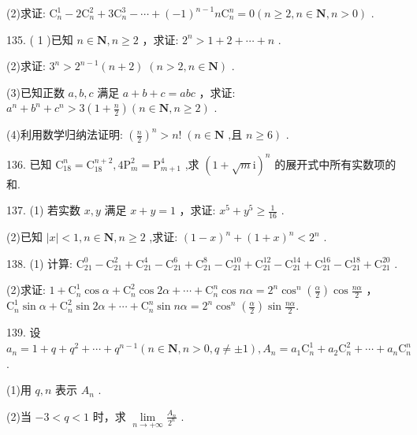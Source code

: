 \documentclass[10pt]{article}
\begin{document}
(2)求证: \({\mathrm{C}}_{n}^{1} - 2{\mathrm{C}}_{n}^{2} + 3{\mathrm{C}}_{n}^{3} - \cdots  + {\left( -1\right) }^{n - 1}n{\mathrm{C}}_{n}^{n} = 0\left( {n \geq  2,n \in  \mathbf{N},n > 0}\right)\) .

135. ( 1 )已知 \(n \in  \mathbf{N},n \geq  2\) ，求证: \({2}^{n} > 1 + 2 + \cdots  + n\) .

(2)求证: \({3}^{n} > {2}^{n - 1}\left( {n + 2}\right) \;\left( {n > 2,n \in  \mathbf{N}}\right)\) .

(3)已知正数 \(a,b,c\) 满足 \(a + b + c = {abc}\) ，求证: \({a}^{n} + {b}^{n} + {c}^{n} > 3\left( {1 + \frac{n}{2}}\right) \left( {n \in  \mathbf{N},n \geq  2}\right)\) .

(4)利用数学归纳法证明: \({\left( \frac{n}{2}\right) }^{n} > n!\;\left( {n \in  \mathbf{N}\text{ ,且 }n \geq  6}\right)\) .

136. 已知 \({\mathrm{C}}_{18}^{n} = {\mathrm{C}}_{18}^{n + 2},4{\mathrm{P}}_{m}^{2} = {\mathrm{P}}_{m + 1}^{4}\) ,求 \({\left( 1 + \sqrt{m}\mathrm{i}\right) }^{n}\) 的展开式中所有实数项的和.

137. (1) 若实数 \(x,y\) 满足 \(x + y = 1\) ，求证: \({x}^{5} + {y}^{5} \geq  \frac{1}{16}\) .

(2)已知 \(\left| x\right|  < 1,n \in  \mathbf{N},n \geq  2\) ,求证: \({\left( 1 - x\right) }^{n} + {\left( 1 + x\right) }^{n} < {2}^{n}\) .

138. (1) 计算: \({\mathrm{C}}_{21}^{0} - {\mathrm{C}}_{21}^{2} + {\mathrm{C}}_{21}^{4} - {\mathrm{C}}_{21}^{6} + {\mathrm{C}}_{21}^{8} - {\mathrm{C}}_{21}^{10} + {\mathrm{C}}_{21}^{12} - {\mathrm{C}}_{21}^{14} + {\mathrm{C}}_{21}^{16} - {\mathrm{C}}_{21}^{18} + {\mathrm{C}}_{21}^{20}\) .

(2)求证: \(1 + {\mathrm{C}}_{n}^{1}\cos \alpha  + {\mathrm{C}}_{n}^{2}\cos {2\alpha } + \cdots  + {\mathrm{C}}_{n}^{n}\cos {n\alpha } = {2}^{n}{\cos }^{n}\left( \frac{\alpha }{2}\right) \cos \frac{n\alpha }{2}\) ， \({\mathrm{C}}_{n}^{1}\sin \alpha  + {\mathrm{C}}_{n}^{2}\sin {2\alpha } + \cdots  + {\mathrm{C}}_{n}^{n}\sin {n\alpha } = {2}^{n}{\cos }^{n}\left( \frac{\alpha }{2}\right) \sin \frac{n\alpha }{2}.\)

139. 设 \({a}_{n} = 1 + q + {q}^{2} + \cdots  + {q}^{n - 1}\left( {n \in  \mathbf{N},n > 0,q \neq   \pm  1}\right) ,{A}_{n} = {a}_{1}{\mathrm{C}}_{n}^{1} + {a}_{2}{\mathrm{C}}_{n}^{2} + \cdots  + {a}_{n}{\mathrm{C}}_{n}^{n}\) .

(1)用 \(q,n\) 表示 \({A}_{n}\) .

(2)当 \(- 3 < q < 1\) 时，求 \(\mathop{\lim }\limits_{{n \rightarrow   + \infty }}\frac{{A}_{n}}{{2}^{n}}\) .
\end{document}
